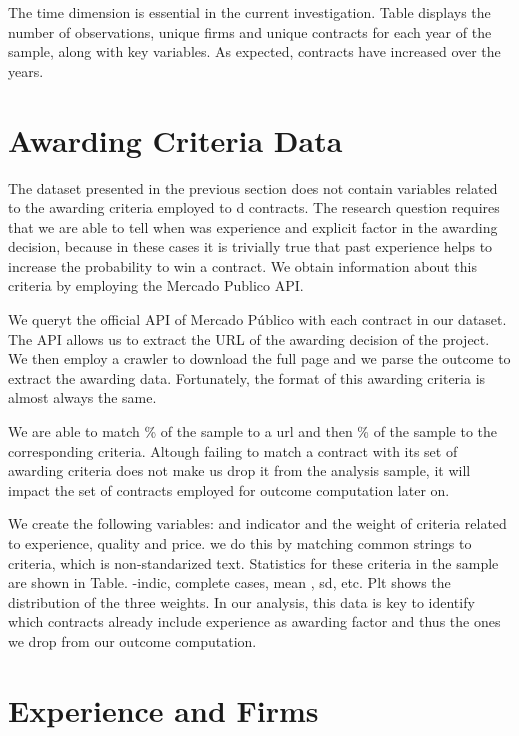 

The time dimension is essential in the current investigation. Table displays the number of observations, unique firms and unique contracts for each year of the sample, along with key variables. As expected, contracts have increased over the years.




\section{Awarding Criteria Data}
The dataset presented in the previous section does not contain variables related to the awarding criteria employed to d contracts. The research question requires that we are able to tell when was experience and explicit factor in the awarding decision, because in these cases it is trivially true that past experience helps to increase the probability to win a contract. We obtain information about this criteria by employing the Mercado Publico API.

We queryt the official API of Mercado Público with each contract in our dataset. The API allows us to extract the URL of the awarding decision of the project. We then employ a crawler to download the full page and we parse the outcome to extract the awarding data. Fortunately, the format of this awarding criteria is almost always the same.

We are able to match \% of the sample to a url and then \% of the sample to the corresponding criteria. Altough failing to match a contract with its set of awarding criteria does not make us drop it from the analysis sample, it will impact the set of contracts employed for outcome computation later on.

We create the following variables: and indicator and the weight of criteria related to experience, quality and price. we do this by matching common strings to criteria, which is non-standarized text. Statistics for these criteria in the sample are shown in Table. -indic, complete cases, mean , sd, etc. Plt shows the distribution of the three weights. In our analysis, this data is key to identify which contracts already include experience as awarding factor and thus the ones we drop from our outcome computation.

\section{Experience and Firms}
